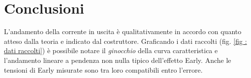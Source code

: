 \section{Conclusioni}\label{sec:conclusioni}
L'andamento della corrente in uscita è qualitativamente in accordo con quanto atteso dalla teoria e indicato dal costruttore. Graficando i dati raccolti (fig. \ref{fig : dati raccolti}) è possibile notare il \emph{ginocchio} della curva caratteristica e l'andamento lineare a pendenza non nulla tipico dell'effetto Early. Anche le tensioni di Early misurate sono tra loro compatibili entro l'errore.
